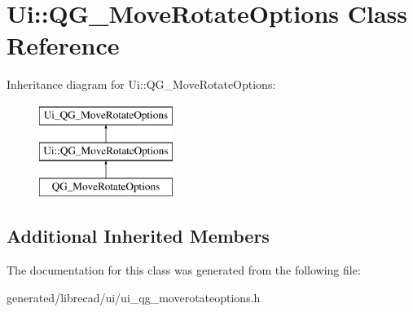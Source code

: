 \hypertarget{classUi_1_1QG__MoveRotateOptions}{\section{Ui\-:\-:Q\-G\-\_\-\-Move\-Rotate\-Options Class Reference}
\label{classUi_1_1QG__MoveRotateOptions}
}
Inheritance diagram for Ui\-:\-:Q\-G\-\_\-\-Move\-Rotate\-Options\-:\begin{figure}[H]
\begin{center}
\leavevmode
\includegraphics[height=3.000000cm]{classUi_1_1QG__MoveRotateOptions}
\end{center}
\end{figure}
\subsection*{Additional Inherited Members}


The documentation for this class was generated from the following file\-:\begin{DoxyCompactItemize}
\item 
generated/librecad/ui/ui\-\_\-qg\-\_\-moverotateoptions.\-h\end{DoxyCompactItemize}
